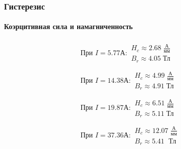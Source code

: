 \documentclass[8pt,pdf,hyperref={unicode}]{beamer}
\begin{document}
	\begin{frame}
		\frametitle{Гистерезис}
		\framesubtitle{Коэрцитивная сила и намагниченность}
		\begin{center}
			\begin{equation}
			\begin{gathered}
			\text{При } I = 5.77 \text{А}:
			\begin{gathered}
			H_c\approx 2.68 \; \frac{\text{А}}{\text{мм}}\\
			B_r\approx 4.05 \; \text{Тл}
			\end{gathered}\\ \\
			\text{При } I = 14.38 \text{А}:
			\begin{gathered}
			H_c\approx 4.99 \; \frac{\text{А}}{\text{мм}}\\
			B_r\approx 4.91 \; \text{Тл}
			\end{gathered}\\ \\
			\text{При } I = 19.87 \text{А}:
			\begin{gathered}
			H_c\approx 6.51 \; \frac{\text{А}}{\text{мм}}\\
			B_r\approx 5.11 \; \text{Тл}
			\end{gathered}\\ \\
			\text{При } I = 37.36 \text{А}:
			\begin{gathered}
			H_c\approx 12.07 \; \frac{\text{А}}{\text{мм}}\\
			B_r\approx 5.41 \; \text{ Тл}
			\end{gathered}\\ \\
			\end{gathered}
				\end{equation}
		\end{center}
	\end{frame}
\end{document}
